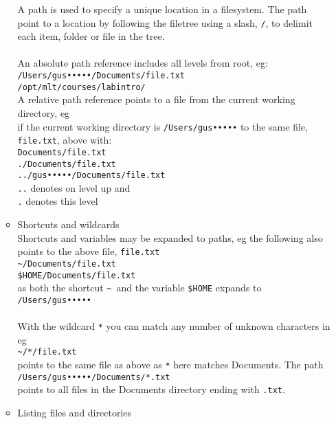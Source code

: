 \documentclass[a4,landscape]{seminar}
\begin{document}
\begin{slide}
\begin{itemize}
\begin{itemize}
      A path is used to specify a unique location in a filesystem. The path point to a location by following the filetree using a slash, \texttt{/}, to delimit each item, folder or file in the tree.\\\\
      An absolute path reference includes all levels from root, eg:\\[1ex]
      \texttt{/Users/gus•••••/Documents/file.txt}\\
      \texttt{/opt/mlt/courses/labintro/}\\[1ex]
      A relative path reference points to a file from the current working directory, eg\\if the current working directory is \texttt{/Users/gus•••••} to the same file, \\ \texttt{file.txt}, above with:\\[1ex]
      \texttt{Documents/file.txt}\\
      \texttt{./Documents/file.txt}\\
      \texttt{../gus•••••/Documents/file.txt}\\[1ex]
      \texttt{..} denotes on level up and\\
      \texttt{.} denotes this level
    \item Shortcuts and wildcards\\[1ex]
      Shortcuts and variables may be expanded to paths, eg the following also points to the above file, \texttt{file.txt}\\[1ex]
      \texttt{\textasciitilde/Documents/file.txt}\\
      \texttt{\$HOME/Documents/file.txt}\\[1ex]
      as both the shortcut \texttt{\textasciitilde}~and the variable \texttt{\$HOME} expands to \texttt{/Users/gus•••••}\\\\
      With the wildcard \texttt{*} you can match any number of unknown characters in eg\\[1ex]
      \texttt{\textasciitilde/*/file.txt}\\[1ex]
      points to the same file as above as \texttt{*} here matches Documents. The path\\[1ex]
      \texttt{/Users/gus•••••/Documents/*.txt}\\[1ex]
      points to all files in the Documents directory ending with \texttt{.txt}.
      \clearpage{}
    \item Listing files and directories\\[1ex]

\end{itemize}
\end{itemize}
\end{slide}
\end{document}
